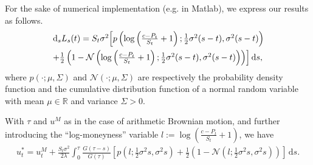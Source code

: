 \documentclass[openany,oneside]{article}
\theoremstyle{definition}
\theoremstyle{remark}
\newcommand{\ts}{\textstyle}
\newcommand{\de}{\,\mathrm{d}}
\begin{document}
{\color{red}
For the sake of numerical implementation (e.g. in Matlab), we express our results as follows.
\begin{multline*}
\ts \de_s L_s(t) = S_t\sigma^2 \Bigl[p\left(\log\left(\frac{c-P_t}{S_t}+1 \right); \frac{1}{2}\sigma^2(s-t), \sigma^2(s-t)\right)\\
   \ts + \frac{1}{2}\left(1-\mathcal{N}\left(\log\left(\frac{c-P_t}{S_t}+1 \right); \frac{1}{2}\sigma^2(s-t), \sigma^2(s-t)\right)\right)\Bigr] \de s,
\end{multline*}
where $p(\cdot;\mu,\Sigma)$ and $\mathcal{N}(\cdot;\mu, \Sigma)$ are respectively the probability density function and the cumulative distribution function of a normal random variable with mean $\mu\in\mathbb{R}$ and variance $\Sigma>0$.

With $\tau$ and $u^M$ as in the case of arithmetic Brownian motion, and further introducing the ``log-moneyness'' variable $l:=\log\left(\frac{c-P_t}{S_t}+1\right)$, we have
\begin{align*}
\ts u^\ast_t = u^M_t + \frac{S_t\sigma^2}{2\lambda}\int_0^\tau \frac{G(\tau-s)}{G(\tau)}\left[p(l;\frac{1}{2}\sigma^2 s, \sigma^2 s)+\frac{1}{2}(1-\mathcal{N}(l;\frac{1}{2}\sigma^2 s, \sigma^2 s))\right] \de s.
\end{align*}
}
\end{document}
